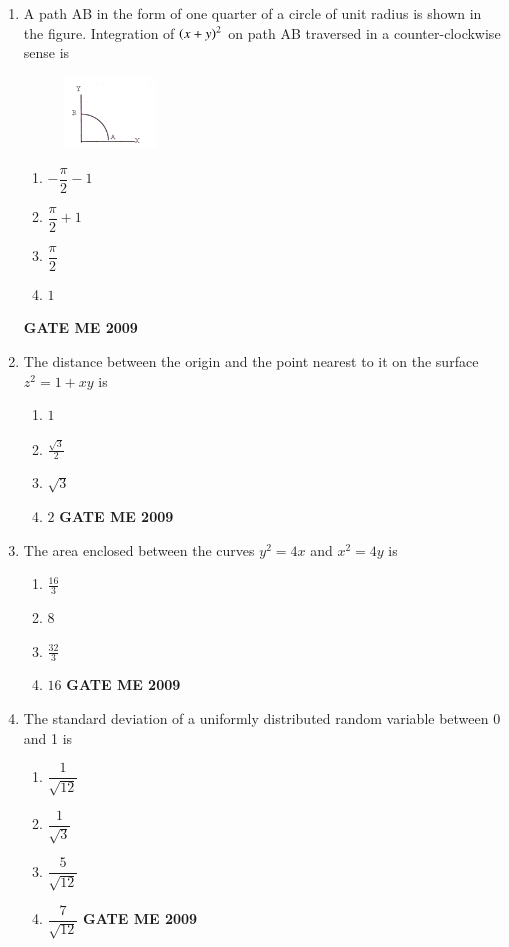 \documentclass[journal]{IEEEtran}
\begin{document}
\begin{enumerate}[leftmargin=0pt]
\item A path AB in the form of one quarter of a circle of unit radius is shown in the figure. Integration of $\left(x + y\right)^2$ on path AB traversed in a counter-clockwise sense is
\begin{figure}[h] 
  \centering
  \includegraphics[width=0.23\textwidth]{Figs/image (4).png}
  \caption{}
\end{figure}

\begin{enumerate}[label=(\Alph*)]
  \item $-\dfrac{\pi}{2} - 1$
  \item $\dfrac{\pi}{2} + 1$
  \item $\dfrac{\pi}{2}$
  \item $1$
\end{enumerate}
\hfill{\textbf{GATE ME 2009}}


\item The distance between the origin and the point nearest to it on the surface $z^2 = 1+xy$ is
\begin{enumerate}[label=(\Alph*)]
  \item $1$
  \item $\frac{\sqrt{3}}{2}$
  \item $\sqrt{3}$
  \item $2$
\hfill{\textbf{GATE ME 2009}}
\end{enumerate}

\item The area enclosed between the curves $y^2 = 4x$ and $x^2 = 4y$ is
\begin{enumerate}[label=(\Alph*)]
  \item $\frac{16}{3}$
  \item $8$
  \item $\frac{32}{3}$
  \item $16$
\hfill{\textbf{GATE ME 2009}}
\end{enumerate}

\item The standard deviation of a uniformly distributed random variable between 0 and 1 is
\begin{enumerate}[label=(\Alph*)]
  \item $\dfrac{1}{\sqrt{12}}$
  \item $\dfrac{1}{\sqrt{3}}$
  \item $\dfrac{5}{\sqrt{12}}$
  \item $\dfrac{7}{\sqrt{12}}$
\hfill{\textbf{GATE ME 2009}}
\end{enumerate}


\end{enumerate}
\end{document}
